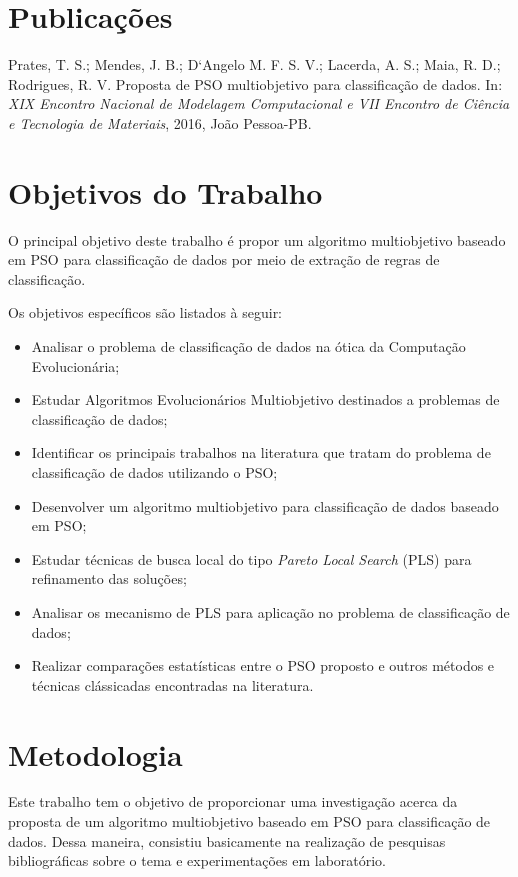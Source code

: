 \documentclass[
	12pt,				%
	openany,			%
	oneside,	
	a4paper,			%
	brazil,				%
	]{unimontes-ppgmsc-abntex2}
\begin{document}
\section{Publicações}

Prates, T. S.; Mendes, J. B.; D‘Angelo M. F. S. V.; Lacerda, A. S.; Maia, R. D.; Rodrigues, R. V. Proposta de PSO multiobjetivo para classificação de dados. In: {\em XIX Encontro Nacional de Modelagem Computacional e VII Encontro de Ciência e Tecnologia de Materiais}, 2016, João Pessoa-PB.

\section{Objetivos do Trabalho}

O principal objetivo deste trabalho é propor um algoritmo multiobjetivo baseado em PSO para classificação de dados por meio de extração de regras de classificação. 

Os objetivos específicos são listados à seguir: 

\begin{itemize}
	\item Analisar o problema de classificação de dados na ótica da Computação Evolucionária;
	\item Estudar Algoritmos Evolucionários Multiobjetivo destinados a problemas de classificação de dados;
	\item Identificar os principais trabalhos na literatura que tratam do problema de classificação de dados utilizando o PSO;
	\item Desenvolver um algoritmo multiobjetivo para classificação de dados baseado em PSO;
	\item Estudar técnicas de busca local do tipo {\em Pareto Local Search} (PLS) para refinamento das soluções;
	\item Analisar os mecanismo de PLS para aplicação no problema de classificação de dados;
	\item Realizar comparações estatísticas entre o PSO proposto e outros métodos e técnicas clássicadas encontradas na literatura.
\end{itemize}

\section{Metodologia}

Este trabalho tem o objetivo de proporcionar uma investigação acerca da proposta de um algoritmo multiobjetivo baseado em PSO para classificação de dados. Dessa maneira, consistiu basicamente na realização de pesquisas bibliográficas sobre o tema e experimentações em laboratório.  
\end{document}
